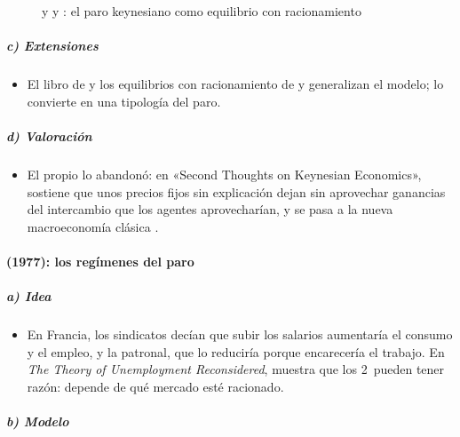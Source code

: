 \documentclass[11pt]{article}
\begin{document}
\begin{figure}[H]
\centering
\caption{ y  y : el paro keynesiano como equilibrio con racionamiento}\label{fig:racionamiento}
\end{figure}

\subparagraph{c) Extensiones}

\begin{itemize}
\item El libro de \textcite{BarroGrossman1976Money} y los equilibrios con racionamiento de \textcite{Benassy1975Neo} y \textcite{Dreze1975Existence} generalizan el modelo;  lo convierte en una tipología del paro.
\end{itemize}

\subparagraph{d) Valoración}

\begin{itemize}
\item El propio  lo abandonó: en «Second Thoughts on Keynesian Economics», \textcite{Barro1979Second} sostiene que unos precios fijos sin explicación dejan sin aprovechar ganancias del intercambio que los agentes aprovecharían, y se pasa a la nueva macroeconomía clásica .
\end{itemize}

\paragraph{ (1977): los regímenes del paro}

\subparagraph{a) Idea}

\begin{itemize}
\item En Francia, los sindicatos decían que subir los salarios aumentaría el consumo y el empleo, y la patronal, que lo reduciría porque encarecería el trabajo. En \emph{The Theory of Unemployment Reconsidered}, \textcite{Malinvaud1977Theory} muestra que los 2~pueden tener razón: depende de qué mercado esté racionado.
\end{itemize}

\subparagraph{b) Modelo}
\end{document}
